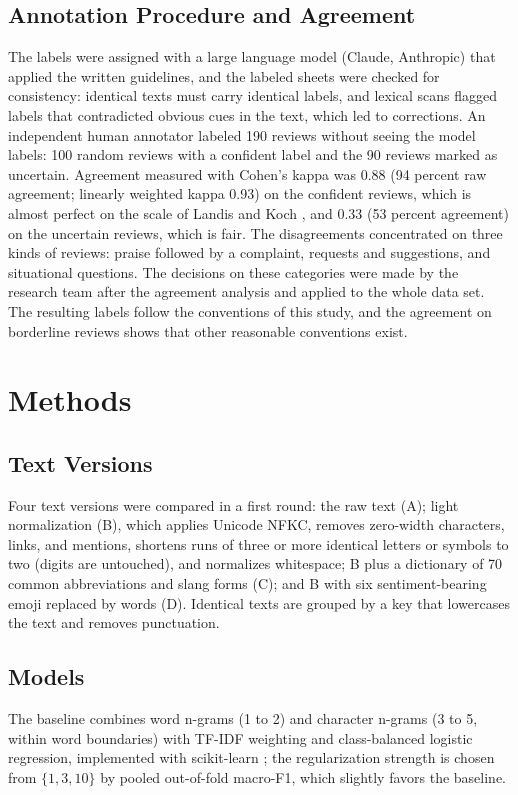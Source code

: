 \documentclass[conference]{IEEEtran}
\begin{document}
\subsection{Annotation Procedure and Agreement}
The labels were assigned with a large language model (Claude, Anthropic) that applied the written guidelines, and the labeled sheets were checked for consistency: identical texts must carry identical labels, and lexical scans flagged labels that contradicted obvious cues in the text, which led to corrections. An independent human annotator labeled 190 reviews without seeing the model labels: 100 random reviews with a confident label and the 90 reviews marked as uncertain. Agreement measured with Cohen's kappa \cite{b13} was 0.88 (94 percent raw agreement; linearly weighted kappa 0.93) on the confident reviews, which is almost perfect on the scale of Landis and Koch \cite{b14}, and 0.33 (53 percent agreement) on the uncertain reviews, which is fair. The disagreements concentrated on three kinds of reviews: praise followed by a complaint, requests and suggestions, and situational questions. The decisions on these categories were made by the research team after the agreement analysis and applied to the whole data set. The resulting labels follow the conventions of this study, and the agreement on borderline reviews shows that other reasonable conventions exist.

\section{Methods}\label{sec:methods}
\subsection{Text Versions}
Four text versions were compared in a first round: the raw text (A); light normalization (B), which applies Unicode NFKC, removes zero-width characters, links, and mentions, shortens runs of three or more identical letters or symbols to two (digits are untouched), and normalizes whitespace; B plus a dictionary of 70 common abbreviations and slang forms (C); and B with six sentiment-bearing emoji replaced by words (D). Identical texts are grouped by a key that lowercases the text and removes punctuation.

\subsection{Models}
The baseline combines word n-grams (1 to 2) and character n-grams (3 to 5, within word boundaries) with TF-IDF weighting and class-balanced logistic regression, implemented with scikit-learn \cite{b15}; the regularization strength is chosen from $\{1,3,10\}$ by pooled out-of-fold macro-F1, which slightly favors the baseline.
\end{document}
